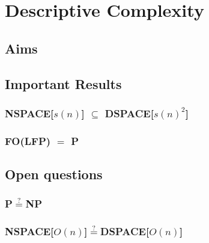 \chapter{Descriptive Complexity}\label{ch:descriptive-complexity}


\section{Aims}\label{sec:aims}


\section{Important Results}\label{sec:important-results}

\subsection{NSPACE[$s(n)$] $\subseteq$ DSPACE[$s(n)^2$]}\label{subsec:nspacesubsetdspacesquared}

\subsection{FO(LFP) $=$ P}\label{subsec:fo(lfp)=p}


\section{Open questions}\label{sec:open-questions}

\subsection{P$\overset{?}{=}$NP}\label{subsec:pnp}

\subsection{NSPACE[$O(n)$]$\overset{?}{=}$DSPACE[$O(n)$]}\label{subsec:nspacedspace}